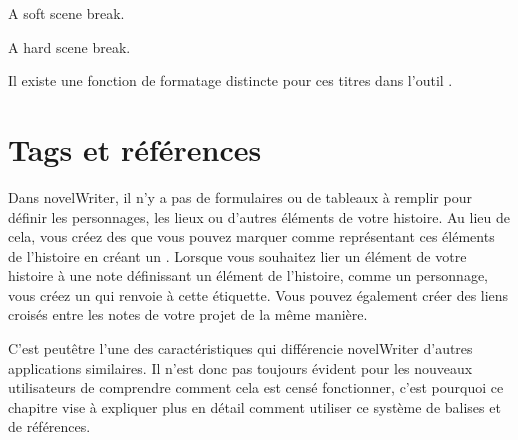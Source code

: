 \documentclass[a4paper,11pt,french]{sphinxmanual}
\begin{document}
\begin{sphinxVerbatim}[commandchars=\\\{\}]

A soft scene break.


A hard scene break.
\end{sphinxVerbatim}

\sphinxAtStartPar
Il existe une fonction de formatage distincte pour ces titres dans l’outil .

\sphinxAtStartPar
{}

\sphinxstepscope


\chapter{Tags et références}
\label{\detokenize{project_references:tags-and-references}}\label{\detokenize{project_references:a-references}}\label{\detokenize{project_references::doc}}
\sphinxAtStartPar
Dans novelWriter, il n’y a pas de formulaires ou de tableaux à remplir pour définir les personnages, les lieux ou d’autres éléments de votre histoire. Au lieu de cela, vous créez des {\hyperref[\detokenize{int_glossary:term-Project-Notes}]{}} que vous pouvez marquer comme représentant ces éléments de l’histoire en créant un {\hyperref[\detokenize{int_glossary:term-Tag}]{}}. Lorsque vous souhaitez lier un élément de votre histoire à une note définissant un élément de l’histoire, comme un personnage, vous créez un {\hyperref[\detokenize{int_glossary:term-Reference}]{}} qui renvoie à cette étiquette. Vous pouvez également créer des liens croisés entre les notes de votre projet de la même manière.

\sphinxAtStartPar
C’est peut\sphinxhyphen{}être l’une des caractéristiques qui différencie novelWriter d’autres applications similaires. Il n’est donc pas toujours évident pour les nouveaux utilisateurs de comprendre comment cela est censé fonctionner, c’est pourquoi ce chapitre vise à expliquer plus en détail comment utiliser ce système de balises et de références.
\end{document}
